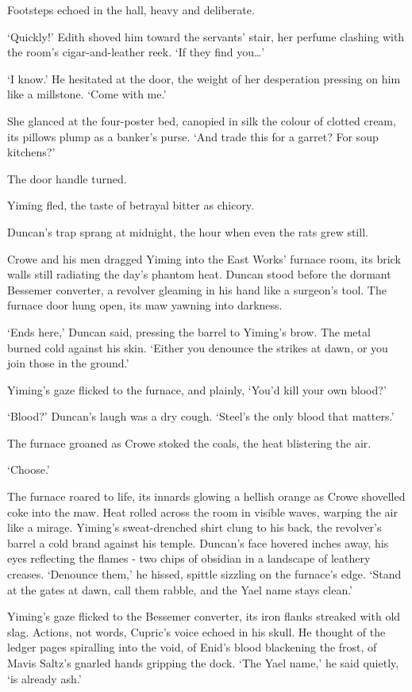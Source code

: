 Footsteps echoed in the hall, heavy and deliberate.

`Quickly!' Edith shoved him toward the servants' stair, her perfume clashing with the room's cigar-and-leather reek. `If they find you\dots'

`I know.' He hesitated at the door, the weight of her desperation pressing on him like a millstone. `Come with me.'

She glanced at the four-poster bed, canopied in silk the colour of clotted cream, its pillows plump as a banker's purse. `And trade this for a garret? For soup kitchens?'

The door handle turned.

Yiming fled, the taste of betrayal bitter as chicory.

Duncan's trap sprang at midnight, the hour when even the rats grew still.

Crowe and his men dragged Yiming into the East Works' furnace room, its brick walls still radiating the day's phantom heat. Duncan stood before the dormant Bessemer converter, a revolver gleaming in his hand like a surgeon's tool. The furnace door hung open, its maw yawning into darkness.

`Ends here,' Duncan said, pressing the barrel to Yiming's brow. The metal burned cold against his skin. `Either you denounce the strikes at dawn, or you join those in the ground.'

Yiming's gaze flicked to the furnace, and plainly, `You'd kill your own blood?'

`Blood?' Duncan's laugh was a dry cough. `Steel's the only blood that matters.'

The furnace groaned as Crowe stoked the coals, the heat blistering the air.

`Choose.'

The furnace roared to life, its innards glowing a hellish orange as Crowe shovelled coke into the maw. Heat rolled across the room in visible waves, warping the air like a mirage. Yiming's sweat-drenched shirt clung to his back, the revolver's barrel a cold brand against his temple. Duncan's face hovered inches away, his eyes reflecting the flames - two chips of obsidian in a landscape of leathery creases. `Denounce them,' he hissed, spittle sizzling on the furnace's edge. `Stand at the gates at dawn, call them rabble, and the Yael name stays clean.'

Yiming's gaze flicked to the Bessemer converter, its iron flanks streaked with old slag. Actions, not words, Cupric's voice echoed in his skull. He thought of the ledger pages spiralling into the void, of Enid's blood blackening the frost, of Mavis Saltz's gnarled hands gripping the dock. `The Yael name,' he said quietly, `is already ash.'


